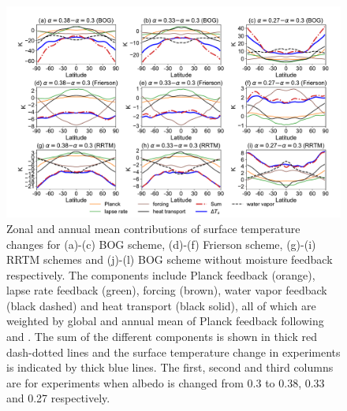 

\begin{figure}[ht]
	\centering
	\includegraphics[width=1.0\linewidth]{figs/polar_amp/delta_ts_decomp}
	\caption[Zonal and annual mean contributions of surface temperature changes from forcing, heat transport and climate feedbacks]{Zonal and annual mean contributions of surface temperature changes for (a)-(c) BOG scheme, (d)-(f) Frierson scheme, (g)-(i) RRTM schemes and (j)-(l) BOG scheme without moisture feedback respectively. The components include Planck feedback (orange), lapse rate feedback (green), forcing (brown), water vapor feedback (black dashed) and heat transport (black solid), all of which are weighted by global and annual mean of Planck feedback following \cite{Feldl2013a} and \cite{Kim2018}. The sum of the different components is shown in thick red dash-dotted lines and the surface temperature change in experiments is indicated by thick blue lines. The first, second and third columns are for experiments when albedo is changed from 0.3 to 0.38, 0.33 and 0.27 respectively.}
	\label{fig:delta_ts_decomp} 
\end{figure}


